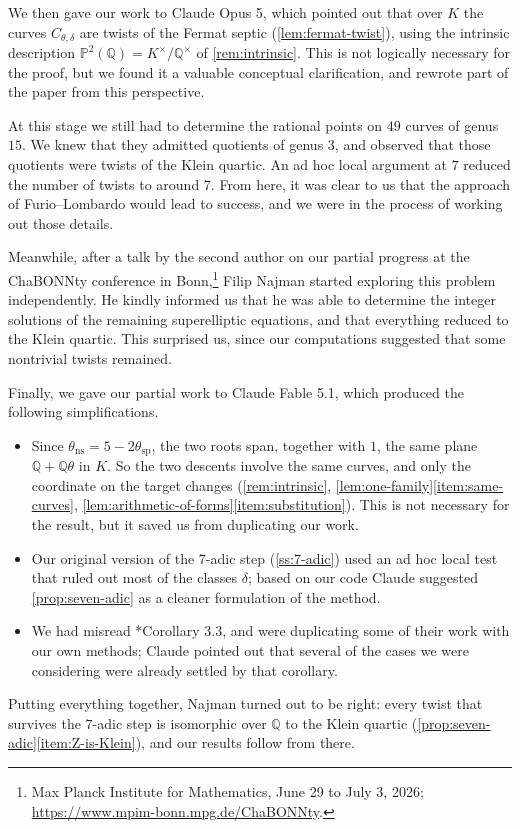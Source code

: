 \documentclass[12pt]{amsart}
\newcommand{\PP}{{\mathbb P}}
\newcommand{\Q}{\mathbb{Q}}
\DeclareMathOperator{\ns}{ns}
\DeclareMathOperator{\spc}{sp}
\numberwithin{equation}{section}
\theoremstyle{definition}
\begin{document}
We then gave our work to Claude Opus 5, which pointed out that over $K$ the
curves $C_{\theta,\delta}$ are twists of the Fermat septic
(\cref{lem:fermat-twist}), using the intrinsic description
$\PP^2(\Q) = K^{\times}/\Q^{\times}$ of \cref{rem:intrinsic}. This is not
logically necessary for the proof, but we found it a valuable conceptual
clarification, and rewrote part of the paper from this perspective.

At this stage we still had to determine the rational points on $49$ curves of
genus $15$. We knew that they admitted quotients of genus $3$, and observed that those quotients were twists of the Klein quartic. An ad hoc local argument at $7$ reduced the number of twists to around 7. From here, it was clear to us that the approach of Furio--Lombardo would lead to success, and we were in the process of working out those details.


Meanwhile, after a talk by the second author on our partial progress at the
ChaBONNty conference in Bonn,\footnote{Max Planck Institute for Mathematics,
  June 29 to July 3, 2026; \url{https://www.mpim-bonn.mpg.de/ChaBONNty}.} Filip
Najman started exploring this problem independently. He kindly informed us that
he was able to determine the integer solutions of the remaining superelliptic
equations, and that everything reduced to the Klein quartic. This surprised us,
since our computations suggested that some nontrivial twists remained.

Finally, we gave our partial work to Claude Fable 5.1, which produced the
following simplifications.
\begin{itemize}
\item Since $\theta_{\ns} = 5 - 2\theta_{\spc}$, the two roots span, together
  with $1$, the same plane $\Q + \Q\theta$ in $K$. So the two descents involve
  the same curves, and only the coordinate on the target changes
  (\cref{rem:intrinsic}, \cref{lem:one-family}\eqref{item:same-curves},
  \cref{lem:arithmetic-of-forms}\eqref{item:substitution}). This is not
  necessary for the result, but it saved us from duplicating our work.
\item Our original version of the $7$-adic step (\cref{ss:7-adic}) used an ad
  hoc local test that ruled out most of the classes $\delta$; based on our code Claude suggested \cref{prop:seven-adic} as a cleaner formulation of the method.
\item We had misread \cite{Furio--Lombardo26}*{Corollary 3.3}, and were
  duplicating some of their work with our own methods; Claude pointed out that
  several of the cases we were considering were already settled by that
  corollary.
\end{itemize}
Putting everything together, Najman turned out to be right: every twist that
survives the $7$-adic step is isomorphic over $\Q$ to the Klein quartic
(\cref{prop:seven-adic}\eqref{item:Z-is-Klein}), and our results follow from
there.
\end{document}
